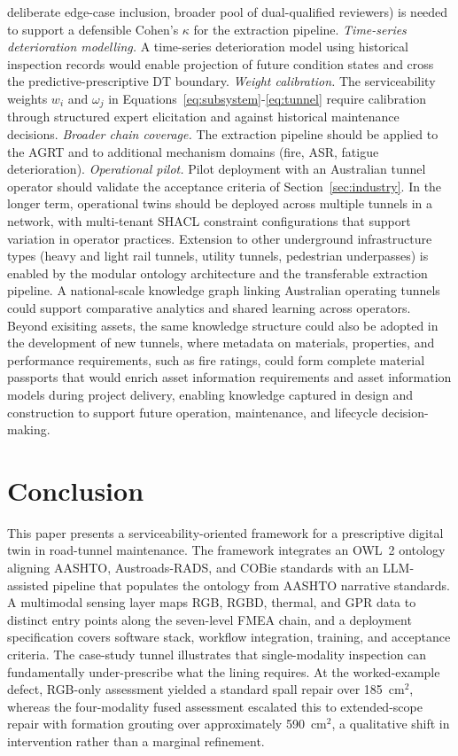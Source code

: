 \documentclass[11pt,a4paper]{article}
\begin{document}
deliberate edge-case inclusion, broader pool of dual-qualified reviewers) is needed to support a defensible Cohen's $\kappa$ for the extraction pipeline. \emph{Time-series deterioration modelling.} A time-series deterioration model using historical inspection records would enable projection of future condition states and cross the predictive-prescriptive DT boundary. \emph{Weight calibration.} The serviceability weights $w_i$ and $\omega_j$ in Equations~\eqref{eq:subsystem}-\eqref{eq:tunnel} require calibration through structured expert elicitation and against historical maintenance decisions. \emph{Broader chain coverage.} The extraction pipeline should be applied to the AGRT and to additional mechanism domains (fire, ASR, fatigue deterioration). \emph{Operational pilot.} Pilot deployment with an Australian tunnel operator should validate the acceptance criteria of Section~\ref{sec:industry}. In the longer term, operational twins should be deployed across multiple tunnels in a network, with multi-tenant SHACL constraint configurations that support variation in operator practices. Extension to other underground infrastructure types (heavy and light rail tunnels, utility tunnels, pedestrian underpasses) is enabled by the modular ontology architecture and the transferable extraction pipeline. A national-scale knowledge graph linking Australian operating tunnels could support comparative analytics and shared learning across operators. Beyond exisiting assets, the same knowledge structure could also be adopted in the development of new tunnels, where metadata on materials, properties, and performance requirements, such as fire ratings, could form complete material passports that would enrich asset information requirements and asset information models during project delivery, enabling knowledge captured in design and construction to support future operation, maintenance, and lifecycle decision-making.

\section{Conclusion}
\label{sec:conclusion}

This paper presents a serviceability-oriented framework for a prescriptive digital twin in road-tunnel maintenance. The framework integrates an OWL~2 ontology aligning AASHTO, Austroads-RADS, and COBie standards with an LLM-assisted pipeline that populates the ontology from AASHTO narrative standards. A multimodal sensing layer maps RGB, RGBD, thermal, and GPR data to distinct entry points along the seven-level FMEA chain, and a deployment specification covers software stack, workflow integration, training, and acceptance criteria. The case-study tunnel illustrates that single-modality inspection can fundamentally under-prescribe what the lining requires. At the worked-example defect, RGB-only assessment yielded a standard spall repair over 185~cm$^2$, whereas the four-modality fused assessment escalated this to extended-scope repair with formation grouting over approximately 590~cm$^2$, a qualitative shift in intervention rather than a marginal refinement.
\end{document}
